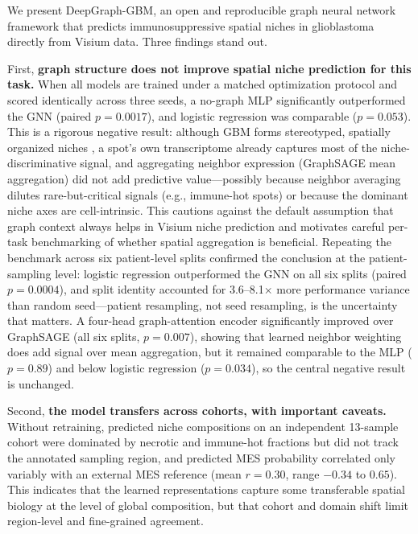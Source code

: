\documentclass[11pt,letterpaper]{article}
\begin{document}
We present DeepGraph-GBM, an open and reproducible graph neural network framework that predicts immunosuppressive spatial niches in glioblastoma directly from Visium data. Three findings stand out.

First, \textbf{graph structure does not improve spatial niche prediction for this task.} When all models are trained under a matched optimization protocol and scored identically across three seeds, a no-graph MLP significantly outperformed the GNN (paired $p=0.0017$), and logistic regression was comparable ($p=0.053$). This is a rigorous negative result: although GBM forms stereotyped, spatially organized niches \cite{greenwald2024,ravi2022}, a spot's own transcriptome already captures most of the niche-discriminative signal, and aggregating neighbor expression (GraphSAGE mean aggregation) did not add predictive value---possibly because neighbor averaging dilutes rare-but-critical signals (e.g., immune-hot spots) or because the dominant niche axes are cell-intrinsic. This cautions against the default assumption that graph context always helps in Visium niche prediction and motivates careful per-task benchmarking of whether spatial aggregation is beneficial. Repeating the benchmark across six patient-level splits confirmed the conclusion at the patient-sampling level: logistic regression outperformed the GNN on all six splits (paired $p=0.0004$), and split identity accounted for 3.6--8.1$\times$ more performance variance than random seed---patient resampling, not seed resampling, is the uncertainty that matters. A four-head graph-attention encoder significantly improved over GraphSAGE (all six splits, $p=0.007$), showing that learned neighbor weighting does add signal over mean aggregation, but it remained comparable to the MLP ($p=0.89$) and below logistic regression ($p=0.034$), so the central negative result is unchanged.

Second, \textbf{the model transfers across cohorts, with important caveats.} Without retraining, predicted niche compositions on an independent 13-sample cohort were dominated by necrotic and immune-hot fractions but did not track the annotated sampling region, and predicted MES probability correlated only variably with an external MES reference \cite{neftel2019,greenwald2024} (mean $r = 0.30$, range $-0.34$ to $0.65$). This indicates that the learned representations capture some transferable spatial biology at the level of global composition, but that cohort and domain shift limit region-level and fine-grained agreement.
\end{document}
